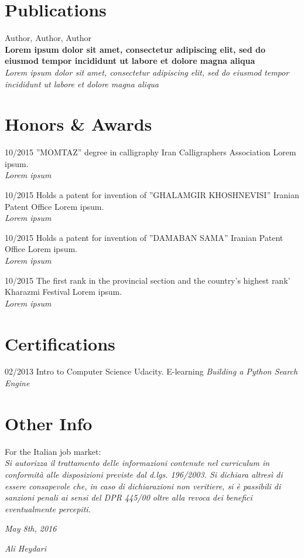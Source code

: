 \documentclass[a4paper]{friggeri-cv}
\begin{document}
\section{Publications}
Author, Author, Author\\
\textbf{Lorem ipsum dolor sit amet, consectetur adipiscing elit, sed do eiusmod tempor incididunt ut labore et dolore magna aliqua}\\
\emph{Lorem ipsum dolor sit amet, consectetur adipiscing elit, sed do eiusmod tempor incididunt ut labore et dolore magna aliqua}
\\
\section{Honors \& Awards}
\begin{entrylist}
  \entry
    {10/2015}
    {''MOMTAZ'' degree in calligraphy}
    {Iran Calligraphers Association}
    {Lorem ipsum.\\
    \emph{Lorem ipsum}}

      \entry
    {10/2015}
    {Holds a patent for invention of ''GHALAMGIR KHOSHNEVISI''}
    {Iranian Patent Office}
    {Lorem ipsum.\\
    \emph{Lorem ipsum}}

          \entry
    {10/2015}
    {Holds a patent for invention of ''DAMABAN SAMA''}
    {Iranian Patent Office}
    {Lorem ipsum.\\
    \emph{Lorem ipsum}}

              \entry
    {10/2015}
    {The first rank in the provincial section and the country's highest rank'}
    {Kharazmi Festival}
    {Lorem ipsum.\\
    \emph{Lorem ipsum}}
\end{entrylist}
\section{Certifications}
\begin{entrylist}
  \entry
    {02/2013}
    {Intro to Computer Science}
    {Udacity. E-learning}
    {\emph{Building a Python Search Engine}}
\end{entrylist}

\section{Other Info}
For the Italian job market:\\
\emph{Si autorizza il trattamento delle informazioni contenute nel curriculum in conformità alle disposizioni previste dal d.lgs. 196/2003. Si dichiara altresì di essere consapevole che, in caso di dichiarazioni non veritiere, si è passibili di sanzioni penali ai sensi del DPR 445/00 oltre alla revoca dei benefici eventualmente percepiti.}
\\
\begin{flushleft}
\emph{May 8th, 2016}
\end{flushleft}
\begin{flushright}
\emph{Ali Heydari}
\end{flushright}
\end{document}
